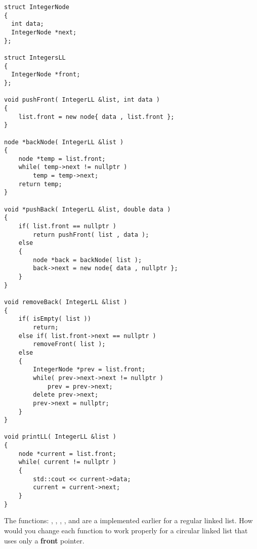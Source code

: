 \documentclass[usenames,dvipsnames]{article}
\begin{document}
\begin{verbatim}
struct IntegerNode
{
  int data;
  IntegerNode *next;
};

struct IntegersLL
{
  IntegerNode *front;
};

void pushFront( IntegerLL &list, int data )
{
    list.front = new node{ data , list.front };
}

node *backNode( IntegerLL &list )
{
    node *temp = list.front;
    while( temp->next != nullptr )
        temp = temp->next;
    return temp;
}

void *pushBack( IntegerLL &list, double data )
{
    if( list.front == nullptr )
        return pushFront( list , data );
    else
    {
        node *back = backNode( list );
        back->next = new node{ data , nullptr };
    }
}

void removeBack( IntegerLL &list )
{ 
    if( isEmpty( list ))
        return;
    else if( list.front->next == nullptr )
        removeFront( list );
    else
    {
        IntegerNode *prev = list.front;
        while( prev->next->next != nullptr )
            prev = prev->next;
        delete prev->next;
        prev->next = nullptr;
    }
}

void printLL( IntegerLL &list )
{
    node *current = list.front;
    while( current != nullptr )
    {
        std::cout << current->data;
        current = current->next;
    }
}
\end{verbatim}


\begin{question}
The functions: , , , , and  are a implemented earlier for a regular linked list.
How would you change each function to work properly for a circular linked list that uses only a \textbf{front} pointer.
\end{question}

\begin{solution}

\end{solution}
\end{document}
